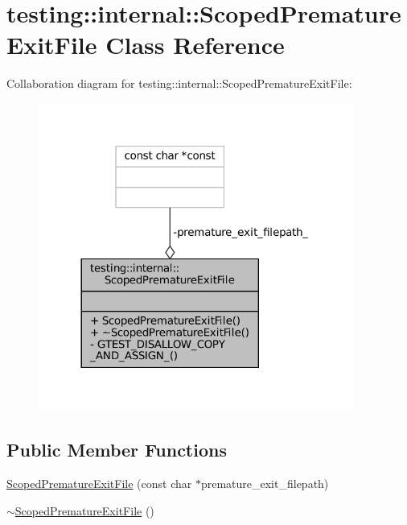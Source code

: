 \hypertarget{classtesting_1_1internal_1_1ScopedPrematureExitFile}{}\section{testing\+:\+:internal\+:\+:Scoped\+Premature\+Exit\+File Class Reference}
\label{classtesting_1_1internal_1_1ScopedPrematureExitFile}


Collaboration diagram for testing\+:\+:internal\+:\+:Scoped\+Premature\+Exit\+File\+:
\nopagebreak
\begin{figure}[H]
\begin{center}
\leavevmode
\includegraphics[width=293pt]{classtesting_1_1internal_1_1ScopedPrematureExitFile__coll__graph}
\end{center}
\end{figure}
\subsection*{Public Member Functions}
\begin{DoxyCompactItemize}
\item 
\hyperlink{classtesting_1_1internal_1_1ScopedPrematureExitFile_ae520883b8a6984a864ce675acedff4a2}{Scoped\+Premature\+Exit\+File} (const char $\ast$premature\+\_\+exit\+\_\+filepath)
\item 
\hyperlink{classtesting_1_1internal_1_1ScopedPrematureExitFile_afa2ddc9bc1c2a90fd0dd82bb11fddc79}{$\sim$\+Scoped\+Premature\+Exit\+File} ()
\end{DoxyCompactItemize}
